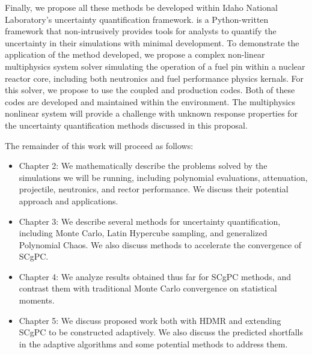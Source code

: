 Finally, we propose all these methods be developed within Idaho National Laboratory's \raven{}\cite{raven}
uncertainty quantification framework. \raven{} is a Python-written framework that non-intrusively provides
tools for analysts to quantify the uncertainty in their simulations with minimal development.  To demonstrate
the application of the method developed, we propose a complex non-linear multiphysics system solver simulating
the operation of a fuel pin within a nuclear reactor core, including both neutronics and fuel performance
physics kernals.  For this solver, we propose to use the coupled \rattlesnake{}\cite{rattlesnake} and 
\bison{}\cite{bison}\cite{mammoth} production codes.
Both of these codes are developed and maintained within the \moose{}\cite{moose} environment.  The
multiphysics nonlinear system will provide a challenge with unknown response properties for the uncertainty
quantification methods discussed in this proposal.

The remainder of this work will proceed as follows:
\begin{itemize}
  \item Chapter 2: We mathematically describe the problems solved by the simulations we will be running,
    including polynomial evaluations, attenuation, projectile, neutronics, and rector performance.  We discuss
    their potential approach and applications.
  \item Chapter 3: We describe several methods for uncertainty quantification, including Monte Carlo, Latin
    Hypercube sampling, and generalized Polynomial Chaos.  We also
    discuss methods to accelerate the convergence of SCgPC.
  \item Chapter 4: We analyze results obtained thus far for SCgPC methods, and contrast them with traditional
    Monte Carlo convergence on statistical moments.
  \item Chapter 5: We discuss proposed work both with HDMR and extending SCgPC to be constructed adaptively.  We
    also discuss the predicted shortfalls in the adaptive algorithms and some potential methods to address
    them.
\end{itemize}

